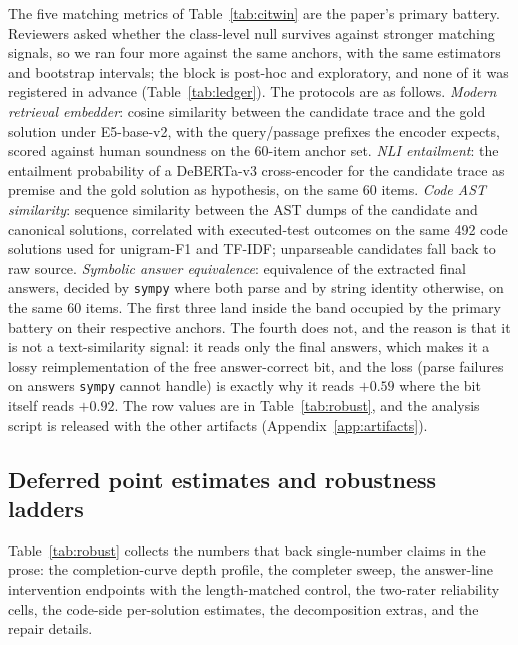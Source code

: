 The five matching metrics of Table~\ref{tab:citwin} are the paper's primary battery.
Reviewers asked whether the class-level null survives against stronger matching signals, so we ran four more against the same anchors, with the same estimators and bootstrap intervals; the block is post-hoc and exploratory, and none of it was registered in advance (Table~\ref{tab:ledger}).
The protocols are as follows.
\emph{Modern retrieval embedder}: cosine similarity between the candidate trace and the gold solution under E5-base-v2, with the query/passage prefixes the encoder expects, scored against human soundness on the 60-item anchor set.
\emph{NLI entailment}: the entailment probability of a DeBERTa-v3 cross-encoder for the candidate trace as premise and the gold solution as hypothesis, on the same 60 items.
\emph{Code AST similarity}: sequence similarity between the AST dumps of the candidate and canonical solutions, correlated with executed-test outcomes on the same 492 code solutions used for unigram-F1 and TF-IDF; unparseable candidates fall back to raw source.
\emph{Symbolic answer equivalence}: equivalence of the extracted final answers, decided by \texttt{sympy} where both parse and by string identity otherwise, on the same 60 items.
The first three land inside the band occupied by the primary battery on their respective anchors.
The fourth does not, and the reason is that it is not a text-similarity signal: it reads only the final answers, which makes it a lossy reimplementation of the free answer-correct bit, and the loss (parse failures on answers \texttt{sympy} cannot handle) is exactly why it reads $+0.59$ where the bit itself reads $+0.92$.
The row values are in Table~\ref{tab:robust}, and the analysis script is released with the other artifacts (Appendix~\ref{app:artifacts}).

\subsection{Deferred point estimates and robustness ladders}
\label{app:robust}

Table~\ref{tab:robust} collects the numbers that back single-number claims in the prose: the completion-curve depth profile, the completer sweep, the answer-line intervention endpoints with the length-matched control, the two-rater reliability cells, the code-side per-solution estimates, the decomposition extras, and the repair details.

